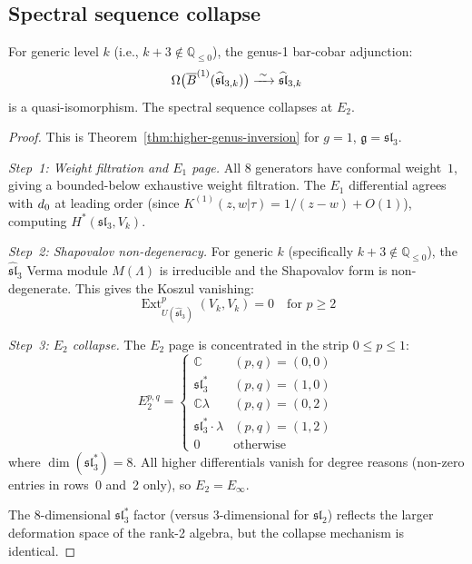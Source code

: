 \subsection{Spectral sequence collapse}

\begin{theorem}
\label{thm:sl3-genus1-inversion}
For generic level $k$ (i.e., $k+3 \notin \mathbb{Q}_{\leq 0}$), the genus-1 bar-cobar adjunction:
\begin{equation}
\Omega\bigl(\overline{B}^{(1)}(\widehat{\mathfrak{sl}}_{3,k})\bigr) \xrightarrow{\;\sim\;} \widehat{\mathfrak{sl}}_{3,k}
\end{equation}
is a quasi-isomorphism.  The spectral sequence collapses at $E_2$.
\end{theorem}

\begin{proof}
This is Theorem~\ref{thm:higher-genus-inversion} for $g=1$, $\mathfrak{g}=\mathfrak{sl}_3$.

\emph{Step~1: Weight filtration and $E_1$ page.}
All $8$ generators have conformal weight~$1$, giving a bounded-below exhaustive weight filtration.  The $E_1$ differential agrees with $d_0$ at leading order (since $K^{(1)}(z,w|\tau) = 1/(z-w) + O(1)$), computing $H^*(\mathfrak{sl}_3, V_k)$.

\emph{Step~2: Shapovalov non-degeneracy.}
For generic $k$ (specifically $k+3 \notin \mathbb{Q}_{\leq 0}$), the $\widehat{\mathfrak{sl}}_3$ Verma module $M(\Lambda)$ is irreducible and the Shapovalov form is non-degenerate.  This gives the Koszul vanishing:
\begin{equation}
\operatorname{Ext}^p_{U(\widehat{\mathfrak{sl}}_3)}(V_k, V_k) = 0 \quad \text{for } p \geq 2
\end{equation}

\emph{Step~3: $E_2$ collapse.}
The $E_2$ page is concentrated in the strip $0 \leq p \leq 1$:
\begin{equation}\label{eq:sl3-E2-page}
E_2^{p,q} = \begin{cases}
\mathbb{C} & (p,q) = (0,0) \\
\mathfrak{sl}_3^* & (p,q) = (1,0) \\
\mathbb{C}\lambda & (p,q) = (0,2) \\
\mathfrak{sl}_3^* \cdot \lambda & (p,q) = (1,2) \\
0 & \text{otherwise}
\end{cases}
\end{equation}
where $\dim(\mathfrak{sl}_3^*) = 8$.  All higher differentials vanish for degree reasons (non-zero entries in rows~0 and~2 only), so $E_2 = E_\infty$.

The 8-dimensional $\mathfrak{sl}_3^*$ factor (versus 3-dimensional for $\mathfrak{sl}_2$) reflects the larger deformation space of the rank-2 algebra, but the collapse mechanism is identical.
\end{proof}

